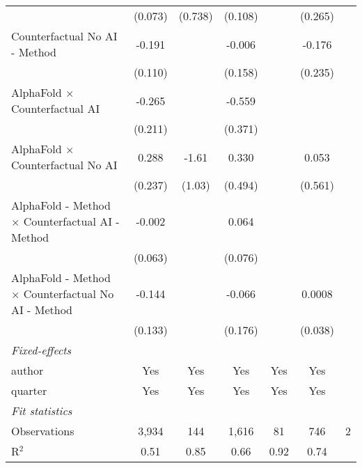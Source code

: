 \begin{tabular}{lcccccc}
                                                              & (0.073) & (0.738)       & (0.108) &         & (0.265) &   \\   
   Counterfactual No AI - Method                              & -0.191  &               & -0.006  &         & -0.176  &   \\   
                                                              & (0.110) &               & (0.158) &         & (0.235) &   \\   
   AlphaFold $\times$ Counterfactual AI                       & -0.265  &               & -0.559  &         &         &   \\   
                                                              & (0.211) &               & (0.371) &         &         &   \\   
   AlphaFold $\times$ Counterfactual No AI                    & 0.288   & -1.61         & 0.330   &         & 0.053   &   \\   
                                                              & (0.237) & (1.03)        & (0.494) &         & (0.561) &   \\   
   AlphaFold - Method $\times$ Counterfactual AI - Method     & -0.002  &               & 0.064   &         &         &   \\   
                                                              & (0.063) &               & (0.076) &         &         &   \\   
   AlphaFold - Method $\times$ Counterfactual No AI - Method  & -0.144  &               & -0.066  &         & 0.0008  &   \\   
                                                              & (0.133) &               & (0.176) &         & (0.038) &   \\   
   \midrule
   \emph{Fixed-effects}\\
   author                                                     & Yes     & Yes           & Yes     & Yes     & Yes     & \\  
   quarter                                                    & Yes     & Yes           & Yes     & Yes     & Yes     & \\  
   \midrule
   \emph{Fit statistics}\\
   Observations                                               & 3,934   & 144           & 1,616   & 81      & 746     & 2\\  
   R$^2$                                                      & 0.51    & 0.85          & 0.66    & 0.92    & 0.74    & \\  

\end{tabular}
